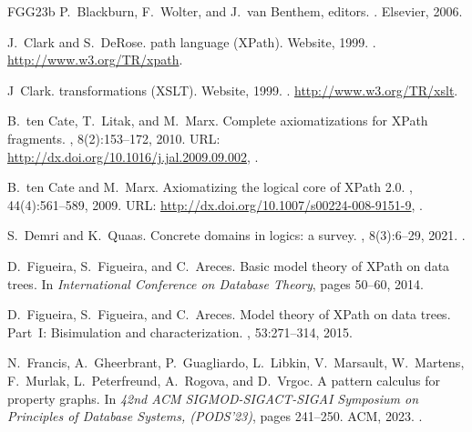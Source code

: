 \documentclass[10pt,a4paper]{amsart}
\theoremstyle{definition}
\theoremstyle{remark}
\begin{document}
\begin{thebibliography}{FGG{\etalchar{+}}23b}
P.~Blackburn, F.~Wolter, and J.~van Benthem, editors.
.
\newblock Elsevier, 2006.

J.~Clark and S.~DeRose.
 path language ({{XP}ath}).
\newblock Website, 1999.
. \url{http://www.w3.org/TR/xpath}.

J~Clark.
 transformations ({XSLT}).
\newblock Website, 1999.
. \url{http://www.w3.org/TR/xslt}.

B.~ten Cate, T.~Litak, and M.~Marx.
\newblock Complete axiomatizations for {{XP}ath} fragments.
, 8(2):153--172, 2010.
\newblock URL: \url{http://dx.doi.org/10.1016/j.jal.2009.09.002}, \href {https://doi.org/10.1016/j.jal.2009.09.002} {}.

B.~ten Cate and M.~Marx.
\newblock Axiomatizing the logical core of {{XP}ath} 2.0.
, 44(4):561--589, 2009.
\newblock URL: \url{http://dx.doi.org/10.1007/s00224-008-9151-9}, \href {https://doi.org/10.1007/s00224-008-9151-9} {}.

S.~Demri and K.~Quaas.
\newblock Concrete domains in logics: a survey.
, 8(3):6--29, 2021.
\newblock \href {https://doi.org/10.1145/3477986.3477988} {}.

D.~Figueira, S.~Figueira, and C.~Areces.
\newblock Basic model theory of {{XP}ath} on data trees.
\newblock In {\em International Conference on Database Theory}, pages 50--60, 2014.

D.~Figueira, S.~Figueira, and C.~Areces.
\newblock Model theory of {{XP}ath} on data trees. {Part~I}: Bisimulation and characterization.
, 53:271--314, 2015.

N.~Francis, A.~Gheerbrant, P.~Guagliardo, L.~Libkin, V.~Marsault, W.~Martens, F.~Murlak, L.~Peterfreund, A.~Rogova, and D.~Vrgoc.
 {A} pattern calculus for property graphs.
\newblock In {\em 42nd {ACM} {SIGMOD-SIGACT-SIGAI} Symposium on Principles of Database Systems, ({PODS}'23)}, pages 241--250. {ACM}, 2023.
\newblock \href {https://doi.org/10.1145/3584372.3588662} {}.


\end{thebibliography}
\end{document}
